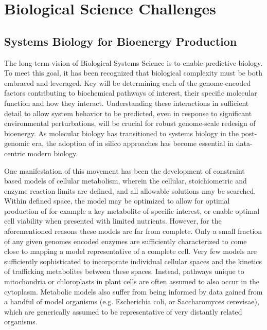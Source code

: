 \documentclass[11pt]{article}
\begin{document}
\section{Biological Science Challenges}

\subsection{Systems Biology for Bioenergy Production}

The long-term vision of Biological Systems Science is to enable
predictive biology. To meet this goal, it has been recognized that
biological complexity must be both embraced and leveraged. Key will be
determining each of the genome-encoded factors contributing to
biochemical pathways of interest, their specific molecular function
and how they interact. Understanding these interactions in sufficient
detail to allow system behavior to be predicted, even in response to
significant environmental perturbations, will be crucial for robust
genome-scale redesign of bioenergy.  As molecular biology has
transitioned to systems biology in the post-genomic era, the adoption
of in silico approaches has become essential in data-centric modern
biology. 

One manifestation of this movement has been the development of
constraint based models of cellular metabolism, wherein the cellular,
stoichiometric and enzyme reaction limits are defined, and all
allowable solutions may be searched. Within defined space, the model
may be optimized to allow for optimal production of for example a key
metabolite of specific interest, or enable optimal cell viability when
presented with limited nutrients. However, for the aforementioned
reasons these models are far from complete. Only a small fraction of
any given genomes encoded enzymes are sufficiently characterized to
come close to mapping a model representative of a complete cell. Very
few models are sufficiently sophisticated to incorporate individual
cellular spaces and the kinetics of trafficking metabolites between
these spaces. Instead, pathways unique to mitochondria or chloroplasts
in plant cells are often assumed to also occur in the
cytoplasm. Metabolic models also suffer from being informed by data
gained from a handful of model organisms (e.g. Escherichia coli, or
Saccharomyces cerevisae), which are generically assumed to be
representative of very distantly related organisms.
\end{document}
